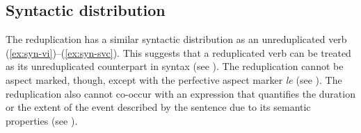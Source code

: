 \subsection{Syntactic distribution}\label{sec:syn-dis}

The reduplication has a similar syntactic distribution as an unreduplicated verb (\ref{ex:syn-vi})--(\ref{ex:syn-svc}). 
This suggests that a reduplicated verb can be treated as its unreduplicated counterpart in syntax (see ).
The reduplication cannot be aspect marked, though, except with the perfective aspect marker \textit{le} (see ).%
The reduplication also cannot co-occur with an expression that quantifies the duration or the extent of the event described by the sentence due to its semantic properties (see ).


